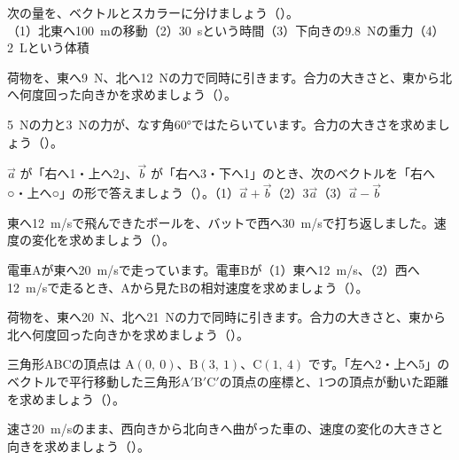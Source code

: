 \bkproblem 次の量を、ベクトルとスカラーに分けましょう（）。\\
（1）北東へ\qty{100}{m}の移動\quad（2）\qty{30}{s}という時間\quad（3）下向きの\qty{9.8}{N}の重力\quad（4）\qty{2}{L}という体積

\bkproblem 荷物を、東へ\qty{9}{N}、北へ\qty{12}{N}の力で同時に引きます。合力の大きさと、東から北へ何度回った向きかを求めましょう（）。

\bkproblem \qty{5}{N}の力と\qty{3}{N}の力が、なす角60°ではたらいています。合力の大きさを求めましょう（）。

\bkproblem $\vec{a}$ が「右へ1・上へ2」、$\vec{b}$ が「右へ3・下へ1」のとき、次のベクトルを「右へ○・上へ○」の形で答えましょう（）。\quad（1）$\vec{a}+\vec{b}$\quad（2）$3\vec{a}$\quad（3）$\vec{a}-\vec{b}$

\bkproblem 東へ\qty{12}{m/s}で飛んできたボールを、バットで西へ\qty{30}{m/s}で打ち返しました。速度の変化を求めましょう（）。

\bkproblem 電車Aが東へ\qty{20}{m/s}で走っています。電車Bが（1）東へ\qty{12}{m/s}、（2）西へ\qty{12}{m/s}で走るとき、Aから見たBの相対速度を求めましょう（）。

\bkproblem 荷物を、東へ\qty{20}{N}、北へ\qty{21}{N}の力で同時に引きます。合力の大きさと、東から北へ何度回った向きかを求めましょう（）。

\bkproblem 三角形ABCの頂点は $\mathrm{A}(0,\ 0)$、$\mathrm{B}(3,\ 1)$、$\mathrm{C}(1,\ 4)$ です。「左へ2・上へ5」のベクトルで平行移動した三角形A$'$B$'$C$'$の頂点の座標と、1つの頂点が動いた距離を求めましょう（）。


\bkproblem 速さ\qty{20}{m/s}のまま、西向きから北向きへ曲がった車の、速度の変化の大きさと向きを求めましょう（）。

